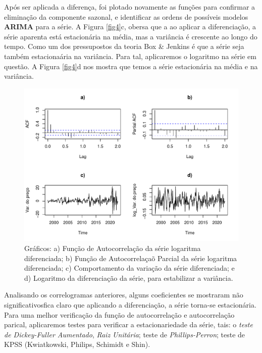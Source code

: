 \documentclass[
	12pt,				%
	openright,			%
	oneside,      %
	a4paper,			%
	english,			%
	french,				%
	spanish,			%
	brazil,				%
	]{abntex2}\usepackage[]{graphicx}\usepackage[table]{xcolor}
\makeatletter
\def\maxwidth{ %
  \ifdim\Gin@nat@width>\linewidth
    \linewidth
  \else
    \Gin@nat@width
  \fi
}
\newenvironment{knitrout}{}{} %
\theoremstyle{definition}
\theoremstyle{remark}
\makeatother
\begin{document}
Após ser aplicada a diferença, foi plotado novamente as funções para confirmar a eliminação da componente sazonal, e identificar as ordens de possíveis modelos \textbf{ARIMA} para a série. A Figura \ref{fig4}c, obersa que a ao aplicar a diferenciação, a série aparenta está estacionária na média, mas a variância é crescente ao longo do tempo. Como um dos pressupostos da teoria Box \& Jenkins é que a série seja também estacionaária na variância. Para tal, aplicaremos o logaritmo na série em questão. A Figura \ref{fig4}d nos mostra que temos a série estacionária na média e na variância.

\begin{knitrout}
\color{fgcolor}\begin{figure}
\includegraphics[width=\maxwidth]{figure/script6-1} \caption[Gráficos]{Gráficos: a) Função de Autocorrelação da série logaritma diferenciada; b) Função de Autocorrelaçaõ Parcial da série logaritma diferenciada; c) Comportamento da variação da série diferenciada; e d) Logaritmo da diferenciação da série, para estabilizar a variância.\label{fig4}}\label{fig:script6}
\end{figure}

\end{knitrout}


Analisando os correlogramas anteriores, alguns coeficientes se mostraram não significativosfica claro que aplicando a diferenciação, a série torna-se estacionária. Para uma melhor verificação da função de autocorrelação e autocorrelação parical, aplicaremos testes para verificar a estacionariedade da série, tais: o \textit{teste de Dickey-Fuller Aumentado}, \textit{Raiz Unitária}; teste de \textit{Phillips-Perron}; teste de KPSS (Kwiatkowski, Philips, Schimidt e Shin). 
\end{document}
